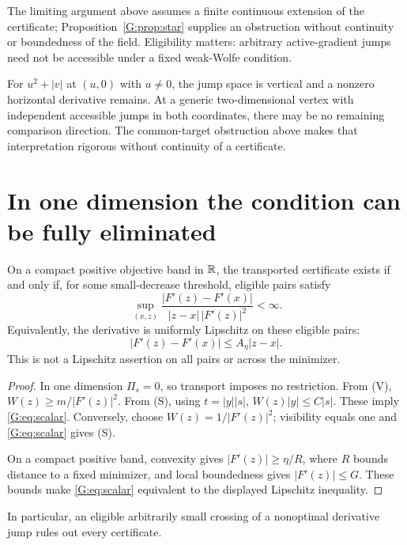 The limiting argument above assumes a finite continuous extension of the certificate; Proposition~\ref{G:prop:star} supplies an obstruction without continuity or boundedness of the field. Eligibility matters: arbitrary active-gradient jumps need not be accessible under a fixed weak-Wolfe condition.

For $u^2+|v|$ at $(u,0)$ with $u\ne0$, the jump space is vertical and a nonzero horizontal derivative remains. At a generic two-dimensional vertex with independent accessible jumps in both coordinates, there may be no remaining comparison direction. The common-target obstruction above makes that interpretation rigorous without continuity of a certificate.


\setcounter{section}{5}
\setcounter{theorem}{0}
\setcounter{equation}{5}


\section{In one dimension the condition can be fully eliminated}
\begin{proposition}
On a compact positive objective band in $\mathbb R$, the transported certificate exists if and only if, for some small-decrease threshold, eligible pairs satisfy
\begin{equation}
 \sup_{(x,z)}\frac{|F'(z)-F'(x)|}{|z-x|\,|F'(z)|^2}<\infty. \label{G:eq:scalar}
\end{equation}
Equivalently, the derivative is uniformly Lipschitz on these eligible pairs:
\[
 |F'(z)-F'(x)|\le A_\eta|z-x|.
\]
This is not a Lipschitz assertion on all pairs or across the minimizer.
\end{proposition}
\begin{proof}
In one dimension $\Pi_s=0$, so transport imposes no restriction. From (V),
$W(z)\ge m/|F'(z)|^2$. From (S), using $t=|y||s|$,
$W(z)|y|\le C|s|$. These imply \eqref{G:eq:scalar}. Conversely, choose
$W(z)=1/|F'(z)|^2$; visibility equals one and \eqref{G:eq:scalar} gives (S).

On a compact positive band, convexity gives $|F'(z)|\ge\eta/R$, where $R$ bounds distance to a fixed minimizer, and local boundedness gives $|F'(z)|\le G$. These bounds make \eqref{G:eq:scalar} equivalent to the displayed Lipschitz inequality.
\end{proof}
In particular, an eligible arbitrarily small crossing of a nonoptimal derivative jump rules out every certificate.

